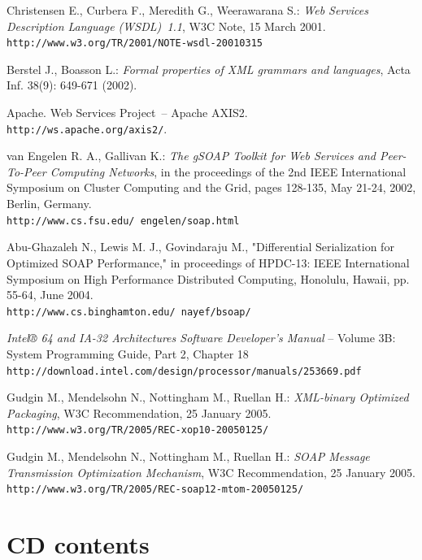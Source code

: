 \documentclass[12pt,notitlepage]{report}
\begin{document}
\begin{thebibliography}{99}
Christensen E., Curbera F., Meredith G., Weerawarana S.: \textit{Web Services Description Language (WSDL)~1.1}, W3C Note, 15 March 2001.\\ \texttt{http://www.w3.org/TR/2001/NOTE-wsdl-20010315}

Berstel J., Boasson L.: \textit{Formal properties of XML grammars and languages}, Acta Inf. 38(9): 649-671 (2002).

Apache. Web Services Project~-- Apache AXIS2.\\
\texttt{http://ws.apache.org/axis2/}.

van Engelen R. A., Gallivan K.: \textit{The gSOAP Toolkit for Web Services and Peer-To-Peer Computing Networks}, in the proceedings of the 2nd IEEE International Symposium on Cluster Computing and the Grid, pages 128-135, May 21-24, 2002, Berlin, Germany.\\
\texttt{http://www.cs.fsu.edu/~engelen/soap.html}

Abu-Ghazaleh N., Lewis M. J., Govindaraju M., "Differential Serialization for Optimized SOAP Performance," in proceedings of HPDC-13: IEEE International Symposium on High Performance Distributed Computing, Honolulu, Hawaii, pp. 55-64, June 2004.\\
\texttt{http://www.cs.binghamton.edu/~nayef/bsoap/}

\textit{Intel® 64 and IA-32 Architectures Software Developer's Manual} -- Volume 3B: System Programming Guide, Part 2, Chapter 18\\
\texttt{http://download.intel.com/design/processor/manuals/253669.pdf}

Gudgin M., Mendelsohn N., Nottingham M., Ruellan H.: \textit{XML-binary Optimized Packaging}, W3C Recommendation, 25 January 2005.\\ \texttt{http://www.w3.org/TR/2005/REC-xop10-20050125/}

Gudgin M., Mendelsohn N., Nottingham M., Ruellan H.: \textit{SOAP Message Transmission Optimization Mechanism}, W3C Recommendation, 25 January 2005.\\ \texttt{http://www.w3.org/TR/2005/REC-soap12-mtom-20050125/}
\end{thebibliography}

\appendix
\chapter{CD contents}
\end{document}
